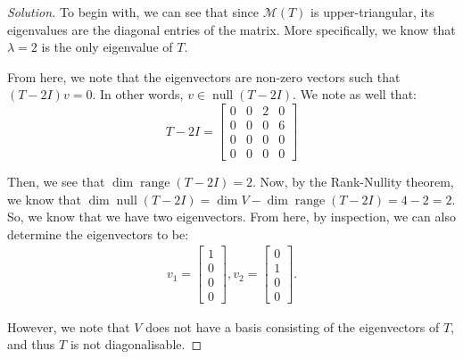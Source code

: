 \documentclass{article}
\newenvironment{solution}{\begin{proof}[Solution]}{\end{proof}}
\DeclareMathOperator*{\vnull}{\mathrm{null}}
\DeclareMathOperator*{\vrange}{\mathrm{range}}
\begin{document}
	\begin{solution}
		To begin with, we can see that since $\mathcal{M}(T)$ is upper-triangular, its eigenvalues are the diagonal entries of the matrix. More specifically, we know that $\lambda = 2$ is the only eigenvalue of $T$.
		
		From here, we note that the eigenvectors are non-zero vectors such that $(T - 2 I)v = 0$. In other words, $v \in \vnull (T - 2I)$. We note as well that:
		\begin{equation*}
			T - 2I =
			\begin{bmatrix}
				0 & 0 & 2 & 0 \\ 0 & 0 & 0 & 6 \\ 0 & 0 & 0 & 0 \\ 0 & 0 & 0 & 0
			\end{bmatrix}
		\end{equation*}
		
		Then, we see that $\dim \vrange (T - 2I) = 2$. Now, by the Rank-Nullity theorem, we know that $\dim \vnull (T - 2I) = \dim V - \dim \vrange (T - 2I) = 4 - 2 = 2$. So, we know that we have two eigenvectors. From here, by inspection, we can also determine the eigenvectors to be:
		\begin{align*}
			v_{1} = \begin{bmatrix}
				1 \\ 0 \\ 0 \\ 0
			\end{bmatrix},
		v_{2} = \begin{bmatrix}
			0 \\ 1 \\ 0 \\ 0
		\end{bmatrix}.
		\end{align*} 
	
		However, we note that $V$ does not have a basis consisting of the eigenvectors of $T$, and thus $T$ is not diagonalisable.
	\end{solution}
	
\end{document}
